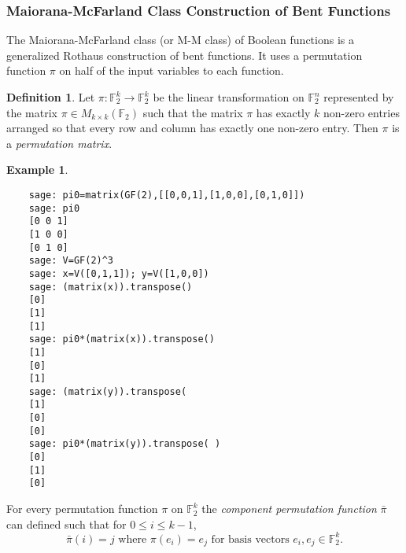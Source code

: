 \documentclass[english]{article}
\def\gftwo{\mathbb{F}_2}
\theoremstyle{plain}
\theoremstyle{definition}
\newtheorem{definition}[theorem]{Definition}%
\newtheorem{example}[theorem]{Example}
\theoremstyle{remark}
\begin{document}
\subsubsection{Maiorana-McFarland Class Construction of Bent Functions}
\par The Maiorana-McFarland class (or M-M class) of Boolean functions is a
generalized Rothaus construction of bent functions. It uses a
permutation function $\pi$ on half of the input variables to each function.

\begin{definition}
  Let $\pi:\gftwo^k\rightarrow\gftwo^k$ be the linear transformation on
  $\gftwo^n$ represented by the matrix $\pi\in M_{k\times k}(\gftwo)$ such that the
  matrix $\pi$ has exactly $k$ non-zero entries arranged so that every row
  and column has exactly one non-zero entry. Then $\pi$ is a
  {\it permutation matrix}.
\end{definition}

\begin{example}
  \ 
  \begin{lstlisting}
    sage: pi0=matrix(GF(2),[[0,0,1],[1,0,0],[0,1,0]])
    sage: pi0
    [0 0 1]
    [1 0 0]
    [0 1 0]
    sage: V=GF(2)^3
    sage: x=V([0,1,1]); y=V([1,0,0])
    sage: (matrix(x)).transpose()
    [0]
    [1]
    [1]
    sage: pi0*(matrix(x)).transpose()
    [1]
    [0]
    [1]
    sage: (matrix(y)).transpose(
    [1]
    [0]
    [0]
    sage: pi0*(matrix(y)).transpose( )
    [0]
    [1]
    [0]
  \end{lstlisting}
\end{example}

\par For every permutation function $\pi$ on $\gftwo^k$ the {\it component permutation
function} $\bar{\pi}$ can defined such that for $0 \leq i \leq k-1$,
\[
\bar{\pi}(i)=j \text{ where } \pi(e_i)=e_j \text{ for basis vectors } e_i,
e_j\in\gftwo^k.
\]
\end{document}
